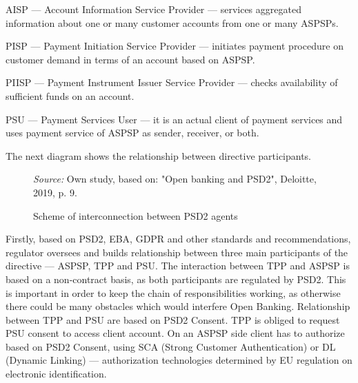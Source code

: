 AISP — Account Information Service Provider — services aggregated information about one or many customer accounts from one or many ASPSPs.

PISP — Payment Initiation Service Provider — initiates payment procedure on customer demand in terms of an account based on ASPSP.

PIISP — Payment Instrument Issuer Service Provider — checks availability of sufficient funds on an account.

PSU — Payment Services User — it is an actual client of payment services and uses payment service of ASPSP as sender, receiver, or both.

The next diagram shows the relationship between directive participants.

\begin{figure}
\centering
{}
\caption{Scheme of interconnection between PSD2 agents}
\medskip
\footnotesize\textit{Source:} Own study, based on: "Open banking and PSD2", Deloitte, 2019, p. 9.
\end{figure}

Firstly, based on PSD2, EBA, GDPR and other standards and recommendations, regulator oversees and builds relationship between three main participants of the directive — ASPSP, TPP and PSU.
The interaction between TPP and ASPSP is based on a non-contract basis, as both participants are regulated by PSD2.
This is important in order to keep the chain of responsibilities working, as otherwise there could be many obstacles which would interfere Open Banking.
Relationship between TPP and PSU are based on PSD2 Consent.
TPP is obliged to request PSU consent to access client account.
On an ASPSP side client has to authorize based on PSD2 Consent, using SCA (Strong Customer Authentication) or DL (Dynamic Linking) — authorization technologies determined by EU regulation on electronic identification.

